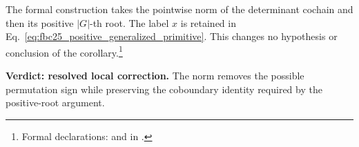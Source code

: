 \documentclass{article}
\begin{document}
The formal construction takes the pointwise norm of the determinant cochain
and then its positive $|G|$-th root. The label $x$ is retained in
Eq.~\ref{eq:fbc25_positive_generalized_primitive}. This changes no hypothesis
or conclusion of the corollary.\footnote{Formal declarations:
 and
 in
.}

\textbf{Verdict: resolved local correction.}
The norm removes the possible permutation sign while preserving the
coboundary identity required by the positive-root argument.



\end{document}
